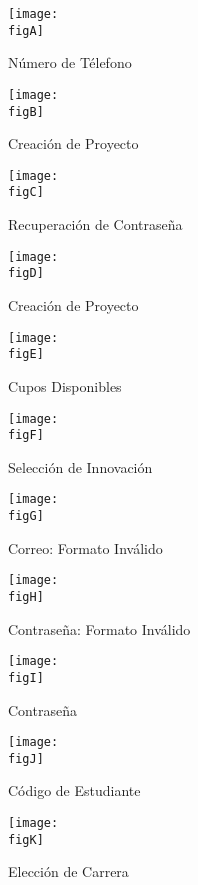\begin{figure}[h]
	\centering
	\texttt{[image: \\figA]}
	\caption{Número de Télefono}
\end{figure}

\begin{figure}[h]
	\centering
	\texttt{[image: \\figB]}
	\caption{Creación de Proyecto}
\end{figure}

\begin{figure}[h]
	\centering
	\texttt{[image: \\figC]}
	\caption{Recuperación de Contraseña}
\end{figure}

\begin{figure}[h]
	\centering
	\texttt{[image: \\figD]}
	\caption{Creación de Proyecto}
\end{figure}

\begin{figure}[h]
	\centering
	\texttt{[image: \\figE]}
	\caption{Cupos Disponibles}
\end{figure}

\begin{figure}[h]
	\centering
	\texttt{[image: \\figF]}
	\caption{Selección de Innovación}
\end{figure}

\begin{figure}[h]
	\centering
	\texttt{[image: \\figG]}
	\caption{Correo: Formato Inválido}
\end{figure}

\begin{figure}[h]
	\centering
	\texttt{[image: \\figH]}
	\caption{Contraseña: Formato Inválido}
\end{figure}

\begin{figure}[h]
	\centering
	\texttt{[image: \\figI]}
	\caption{Contraseña}
\end{figure}

\begin{figure}[h]
	\centering
	\texttt{[image: \\figJ]}
	\caption{Código de Estudiante}
\end{figure}

\begin{figure}[h]
	\centering
	\texttt{[image: \\figK]}
	\caption{Elección de Carrera}
\end{figure}

